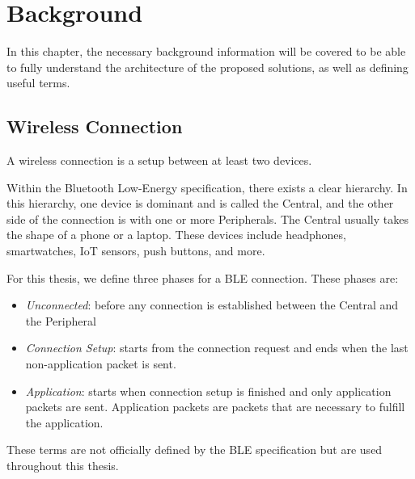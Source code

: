 \chapter{Background}
\label{chp:chapter_2}

In this chapter, the necessary background information will be covered to be able to fully understand the architecture of the proposed solutions, as well as defining useful terms. 

\section{Wireless Connection}
\label{sec:ch2_wireless_connection}
A wireless connection is a setup between at least two devices. 

Within the Bluetooth Low-Energy specification, there exists a clear hierarchy. In this hierarchy, one device is dominant and is called the Central, and the other side of the connection is with one or more Peripherals. The Central usually takes the shape of a phone or a laptop. These devices include headphones, smartwatches, IoT sensors, push buttons, and more. 

For this thesis, we define three phases for a BLE connection. These phases are:
\begin{itemize}
    \item \textit{Unconnected}: before any connection is established between the Central and the Peripheral
    \item \textit{Connection Setup}: starts from the connection request and ends when the last non-application packet is sent. 
    \item \textit{Application}: starts when connection setup is finished and only application packets are sent. Application packets are packets that are necessary to fulfill the application. 
\end{itemize}
These terms are not officially defined by the BLE specification but are used throughout this thesis. 

